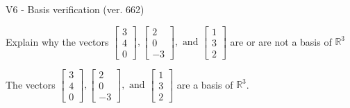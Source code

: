\begin{exercise}
  \begin{exerciseTitle}V6 - Basis verification (ver. 662)\end{exerciseTitle}
  \begin{exerciseStatement}
    Explain why the vectors \(\left[\begin{array}{r}
3 \\
4 \\
0
\end{array}\right] , \left[\begin{array}{r}
2 \\
0 \\
-3
\end{array}\right] , \text{ and } \left[\begin{array}{r}
1 \\
3 \\
2
\end{array}\right]\) are or are not a basis of \(\mathbb{R}^3\)	


  \end{exerciseStatement}
  \begin{exerciseAnswer}
   The vectors \(\left[\begin{array}{r}
3 \\
4 \\
0
\end{array}\right] , \left[\begin{array}{r}
2 \\
0 \\
-3
\end{array}\right] , \text{ and } \left[\begin{array}{r}
1 \\
3 \\
2
\end{array}\right]\) 
  	 are  a basis of \(\mathbb{R}^3\).
  


  \end{exerciseAnswer}
\end{exercise}